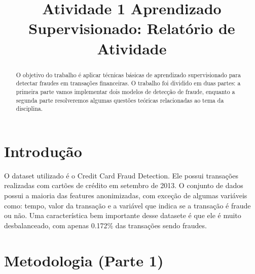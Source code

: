 \documentclass[conference]{IEEEtran}
\begin{document}
\pagestyle{plain}
\sloppy


\title{Atividade 1 Aprendizado Supervisionado: Relatório de Atividade}

\author{
}

\maketitle
\begin{abstract}
O objetivo do trabalho é aplicar técnicas básicas de aprendizado supervisionado para detectar fraudes em transações financeiras. O trabalho foi dividido em duas partes: a primeira parte vamos implementar dois modelos de detecção de fraude, enquanto a segunda parte resolveremos algumas questões teóricas relacionadas ao tema da disciplina.
\end{abstract}

\section{Introdução}
\label{sec:introducao}
  O dataset utilizado é o Credit Card Fraud Detection. Ele possui transações realizadas com cartões de crédito em setembro de 2013. O conjunto de dados possui a maioria das features anonimizadas, com exceção de algumas variáveis como: tempo, valor da transação e a variável que indica se a transação é fraude ou não. Uma característica bem importante desse datasete é que ele é muito desbalanceado, com apenas 0.172\% das transações sendo fraudes. 

\section{Metodologia (Parte 1)}
\label{sec:metodologia}
\end{document}
